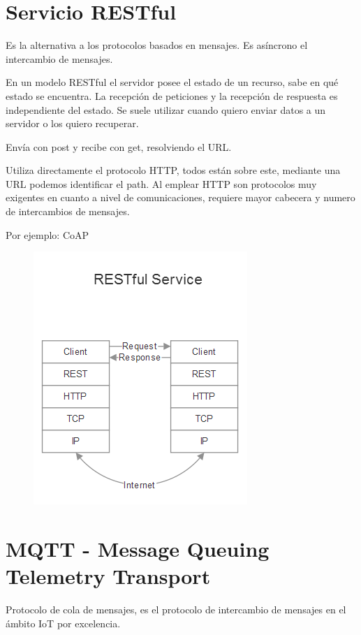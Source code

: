 \documentclass[12pt]{report} %
\begin{document}
\newpage

\section{Servicio RESTful}

Es la alternativa a los protocolos basados en mensajes. Es asíncrono el intercambio de mensajes.

En un modelo RESTful el servidor posee el estado de un recurso, sabe en qué estado se encuentra.
La recepción de peticiones y la recepción de respuesta es independiente del estado. Se suele utilizar cuando quiero enviar datos a un servidor o los quiero recuperar.

Envía con post y recibe con get, resolviendo el URL.

Utiliza directamente el protocolo HTTP, todos están sobre este, mediante una URL podemos identificar el path.
Al emplear HTTP son protocolos muy exigentes en cuanto a nivel de comunicaciones, requiere mayor cabecera y numero de intercambios de mensajes.

Por ejemplo: CoAP

\begin{figure}[H]
	{\includegraphics[scale=.7]{2021-04-08 09_36_12-2021-04-07 17-01-12.mkv.png}}
\end{figure}

\section{MQTT - Message Queuing Telemetry Transport}
Protocolo de cola de mensajes, es el protocolo de intercambio de mensajes en el ámbito IoT por excelencia.
\end{document}

